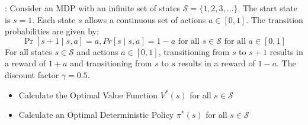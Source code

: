 \documentclass[12pt]{exam}
\begin{document}
\begin{questions}
%
%
%

: Consider an MDP with an infinite set of states $\mathcal{S} = \{1,2,3,\ldots \}$. The start state is $s=1$. Each state $s$ allows a continuous set of actions $a \in [0,1]$. The transition probabilities are given by: $$\Pr[s+1 \mid s, a] = a, Pr[s \mid s, a] = 1 - a \mbox{ for all } s \in \mathcal{S} \mbox{ for all } a \in [0,1]$$
 For all states $s \in \mathcal{S}$ and actions $a \in [0,1]$, transitioning from $s$ to $s+1$ results in a reward of $1+a$ and transitioning from $s$ to $s$ results in a reward of $1-a$. The discount factor $\gamma=0.5$.
\begin{itemize}
\item Calculate the Optimal Value Function $V^*(s)$ for all $s \in \mathcal{S}$
\item Calculate an Optimal Deterministic Policy $\pi^*(s)$ for all $s \in \mathcal{S}$
\end{itemize}
\vspace{10mm}


\end{questions}
\end{document}
